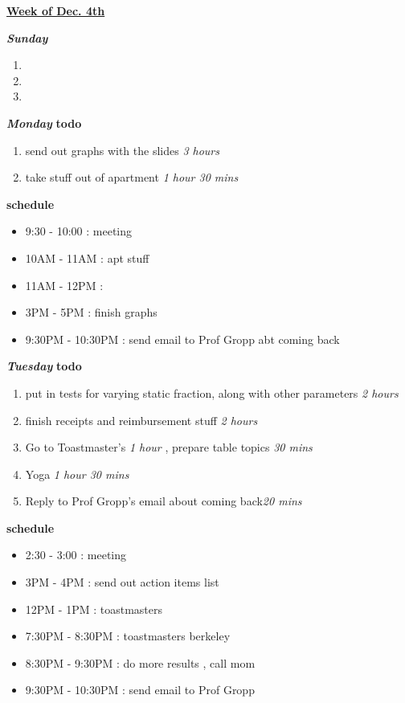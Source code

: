 \documentclass[11pt]{article}
\newcommand{\timeEst}[1]{\textit{#1}}
\begin{document}
\underline{\textbf{Week of Dec. 4th}}

\textbf{\textit{Sunday}}
\begin{enumerate}
\item
\item
\item
\end{enumerate}

\textbf{\textit{Monday}}
\textbf{todo}
\begin{enumerate}
\item send out graphs with the slides \timeEst{3 hours}
\item take stuff out of apartment \timeEst {1 hour 30 mins}
\end{enumerate}

\textbf{schedule}
\begin{itemize}
\item 9:30 - 10:00 : meeting
\item 10AM - 11AM : apt stuff
\item 11AM - 12PM :
\item 3PM - 5PM : finish graphs
\item 9:30PM - 10:30PM : send email to Prof Gropp abt coming back
\end{itemize}

\textbf{\textit{Tuesday}}
\textbf{todo}
\begin{enumerate}
\item put in tests for varying static fraction, along with other parameters \timeEst{2 hours}
\item finish receipts and reimbursement stuff \timeEst{2 hours}
\item Go to Toastmaster's \timeEst{1 hour} , prepare table topics \timeEst{30 mins}
\item Yoga \timeEst{1 hour 30 mins}
\item Reply to Prof Gropp's email about coming back\timeEst{20 mins}
\end{enumerate}

\textbf{schedule}
\begin{itemize}
\item 2:30 - 3:00 :  meeting
\item 3PM - 4PM : send out action items list
\item 12PM - 1PM : toastmasters
\item 7:30PM - 8:30PM : toastmasters berkeley
\item 8:30PM - 9:30PM :  do more results , call mom
\item 9:30PM - 10:30PM : send email to Prof Gropp
\end{itemize}
\end{document}
